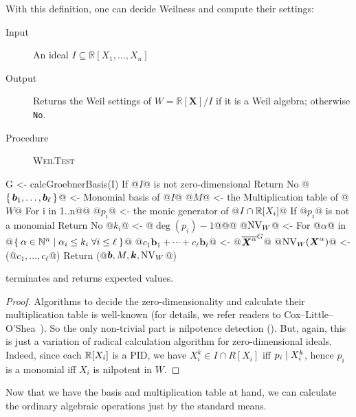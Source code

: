 With this definition, one can decide Weilness and compute their settings:

\begin{algorithm}\label{alg:weil-test}
  \hspace{1em}\vspace{-.25em}
  \begin{description}
    \item[Input] An ideal $I \subseteq \mathbb{R}[X_1, \dots, X_n]$
    \item[Output] Returns the Weil settings of $W = \mathbb{R}[\boldsymbol{X}]/I$ if it is a Weil algebra; otherwise \verb|No|.
    \item[Procedure] \textup{\textsc{WeilTest}}
  \end{description}

  \begin{alg}
G <- calcGroebnerBasis(I)
If @$I$@ is not zero-dimensional
  Return No
@$\set{\boldsymbol{b}_1, \dots, \boldsymbol{b}_\ell}$@ <- Monomial basis of @$I$@
@$M$@ <- the Multiplication table of @$W$@
For i in 1..n@\label{line:weil-test:radical-start}@
  @$p_i$@ <- the monic generator of @$I \cap \mathbb{R}[X_i]$@
  If @$p_i$@ is not a monomial
    Return No
  @$k_i$@ <- @$\deg(p_i) - 1$@@\label{line:weil-test:radical-end}@
@$\operatorname{NV}_W$@ <- {}
For @$\alpha$@ in @$\Set{\alpha \in \mathbb{N}^n | \alpha_i \leq k_i \; \forall i \leq \ell}$@
  @$c_1 \boldsymbol{b}_1 + \cdots + c_\ell \boldsymbol{b}_\ell$@ <- @${\overline{\boldsymbol{X}^\alpha}}^{G}$@
  @$\operatorname{NV}_W(\boldsymbol{X}^\alpha)$@ <- (@$c_1, \dots, c_\ell$@)
Return (@$\vec{\boldsymbol{b}}, M, \vec{k}, \NonVan_W$@)
\end{alg}
\end{algorithm}

\begin{theorem}
   terminates and returns expected values.
\end{theorem}
\begin{proof}
  Algorithms to decide the zero-dimensionality and calculate their multiplication table is well-known (for details, we refer readers to Cox--Little--O'Shea~\cite[Chapter 2]{CLO:2005}).
  So the only non-trivial part is nilpotence detection ().
  But, again, this is just a variation of radical calculation algorithm for zero-dimensional ideals.
  Indeed, since each $\mathbb{R}[X_i]$ is a PID, we have $X_i^k \in I \cap R[X_i]$ iff $p_i \mathrel{\mid} X_i^k$, hence $p_i$ is a monomial iff $X_i$ is nilpotent in $W$.
\end{proof}
Now that we have the basis and multiplication table at hand, we can calculate the ordinary algebraic operations just by the standard means.

